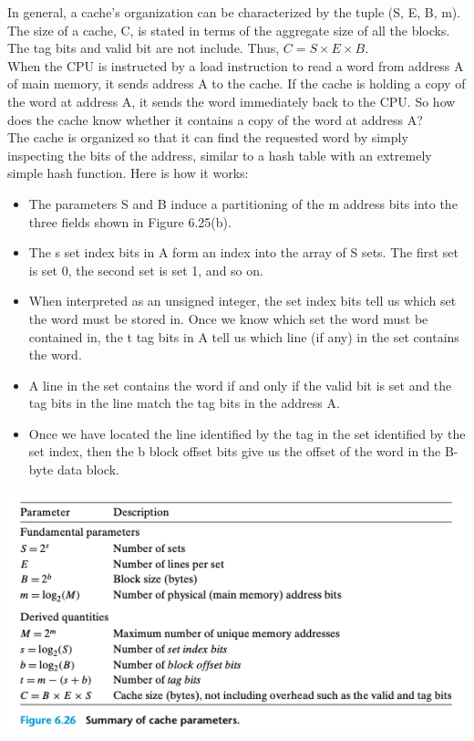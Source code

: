 \documentclass[11pt]{article}
\begin{document}
In general, a cache's organization can be characterized by the tuple (S, E, B, m). The size of a cache, C, is stated in terms of the aggregate size of all the blocks. The tag bits and valid bit are not include. Thus, \(C = S \times E \times B\).\\


When the CPU is instructed by a load instruction to read a word from address A of main memory, it sends address A to the cache. If the cache is holding a copy of the word at address A, it sends the word immediately back to the CPU. So how does the cache know whether it contains a copy of the word at address A?\\

The cache is organized so that it can find the requested word by simply inspecting the bits of the address, similar to a hash table with an extremely simple hash function. Here is how it works:\\
\begin{itemize}
\item The parameters S and B induce a partitioning of the m address bits into the three fields shown in Figure 6.25(b).\\
\item The s set index bits in A form an index into the array of S sets. The first set is set 0, the second set is set 1, and so on.\\
\item When interpreted as an unsigned integer, the set index bits tell us which set the word must be stored in. Once we know which set the word must be contained in, the t tag bits in A tell us which line (if any) in the set contains the word.\\
\item A line in the set contains the word if and only if the valid bit is set and the tag bits in the line match the tag bits in the address A.\\
\item Once we have located the line identified by the tag in the set identified by the set index, then the b block offset bits give us the offset of the word in the B-byte data block.\\
\end{itemize}

\begin{center}
\includegraphics[width=.9\linewidth]{pics/figure6.26-cache-parameters.png}
\end{center}
\end{document}
